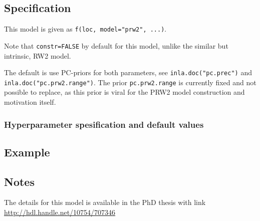 \documentclass[a4paper,11pt]{article}
\begin{document}
\subsection*{Specification}
This model is given as \texttt{f(loc, model="prw2", ...)}.

Note that \texttt{constr=FALSE} by default for this model, unlike the
similar but intrinsic, RW2 model.

The default is use PC-priors for both parameters, see
\texttt{inla.doc("pc.prec")} and \texttt{inla.doc("pc.prw2.range")}.
The prior \texttt{pc.prw2.range} is currently fixed and not possible
to replace, as this prior is viral for the PRW2 model construction and
motivation itself.

\subsubsection*{Hyperparameter spesification and default values}


\subsection*{Example}
{\small}

\subsection*{Notes}

The details for this model is available in the PhD thesis with link
\url{http://hdl.handle.net/10754/707346}
\end{document}
